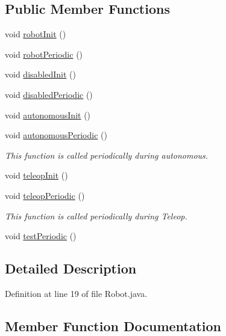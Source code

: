 \subsection*{Public Member Functions}
\begin{DoxyCompactItemize}
\item 
void \hyperlink{classfrc_1_1robot_1_1Robot_a1d28582cf3dc31568c3581f631c92f13}{robot\+Init} ()
\item 
void \hyperlink{classfrc_1_1robot_1_1Robot_a7e63e32ebe8ad3d33bbc3b09092a9f1f}{robot\+Periodic} ()
\item 
void \hyperlink{classfrc_1_1robot_1_1Robot_ac19810fbf26efd4cd47cbd7568b4ad2a}{disabled\+Init} ()
\item 
void \hyperlink{classfrc_1_1robot_1_1Robot_a2bc1b0ce100e4783ba3d549e6ac07ae3}{disabled\+Periodic} ()
\item 
void \hyperlink{classfrc_1_1robot_1_1Robot_a5b1c022cd3e2b9f6e5dde62571839173}{autonomous\+Init} ()
\item 
void \hyperlink{classfrc_1_1robot_1_1Robot_a7dcfe7d0d65d1051eb095b8eb1aebd72}{autonomous\+Periodic} ()
\begin{DoxyCompactList}\small\item\em This function is called periodically during autonomous. \end{DoxyCompactList}\item 
void \hyperlink{classfrc_1_1robot_1_1Robot_a209dbf07bfec75d73fa53126a8e31b88}{teleop\+Init} ()
\item 
void \hyperlink{classfrc_1_1robot_1_1Robot_ae807171661cbc29081bc10f06d6831e7}{teleop\+Periodic} ()
\begin{DoxyCompactList}\small\item\em This function is called periodically during Teleop. \end{DoxyCompactList}\item 
void \hyperlink{classfrc_1_1robot_1_1Robot_abd152f34b9f33d5cdf835aa61331f33e}{test\+Periodic} ()
\end{DoxyCompactItemize}


\subsection{Detailed Description}


Definition at line 19 of file Robot.\+java.



\subsection{Member Function Documentation}
\mbox{\label{classfrc_1_1robot_1_1Robot_a5b1c022cd3e2b9f6e5dde62571839173}} 
